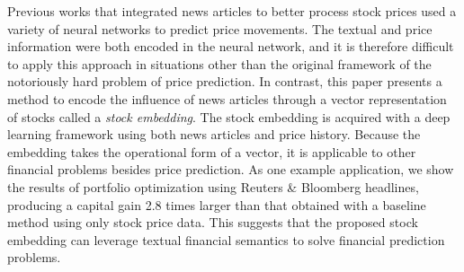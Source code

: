 Previous works that integrated news articles to better process stock prices used a variety of neural networks to predict price movements. The textual and price information were both encoded in the neural network, and it is therefore difficult to apply this approach in situations other than the original framework of the notoriously hard problem of price prediction. In contrast, this paper presents a method to encode the influence of news articles through a vector representation of stocks called a {\em stock embedding}. The stock embedding is acquired with a deep learning framework using both news articles and price history. Because the embedding takes the operational form of a vector, it is applicable to other financial problems besides price prediction. As one example application, we show the results of portfolio optimization using Reuters \& Bloomberg headlines, producing a capital gain 2.8 times larger than that obtained with a baseline method using only stock price data. This suggests that the proposed stock embedding can leverage textual financial semantics to solve financial prediction problems.
